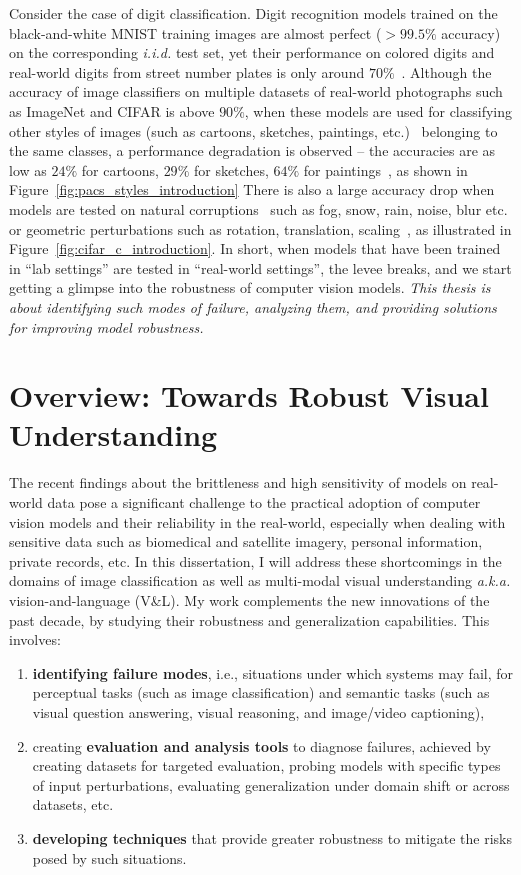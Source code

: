Consider the case of digit classification.
Digit recognition models trained on the black-and-white MNIST training images are almost perfect ($>99.5\%$ accuracy) on the corresponding \textit{i.i.d.} test set, yet their performance on colored digits and real-world digits from street number plates is only around $70\%$~\citep{xu2020robust}.
Although the accuracy of image classifiers on multiple datasets of real-world photographs such as ImageNet and CIFAR is above $90\%$, when these models are used for classifying other styles of images (such as cartoons, sketches, paintings, etc.)~\citep{venkateswara2017deep,li2017deeper} belonging to the same classes, a performance degradation is observed -- the accuracies are as low as $24\%$ for cartoons, $29\%$ for sketches, $64\%$ for paintings~\citep{nam2021reducing}, as shown in Figure~\ref{fig:pacs_styles_introduction}
There is also a large accuracy drop when models are tested on natural corruptions~\citep{hendrycks2018benchmarking} such as fog, snow, rain, noise, blur etc. or geometric perturbations such as rotation, translation, scaling~\citep{wong2020learning}, as illustrated in Figure~\ref{fig:cifar_c_introduction}.
In short, when models that have been trained in ``lab settings'' are tested in ``real-world settings'', the levee breaks, and we start getting a glimpse into the robustness of computer vision models. 
\textit{This thesis is about identifying such modes of failure, analyzing them, and providing solutions for improving model robustness.}

\section{Overview: Towards Robust Visual Understanding}
The recent findings about the brittleness and high sensitivity of models on real-world data pose a significant challenge to the practical adoption of computer vision models and their reliability in the real-world, especially when dealing with sensitive data such as biomedical and satellite imagery, personal information, private records, etc.
In this dissertation, I will address these shortcomings in the domains of image classification as well as multi-modal visual understanding \textit{a.k.a.} vision-and-language (V\&L).
My work complements the new innovations of the past decade, by studying their robustness and generalization capabilities.
This involves:
\begin{enumerate} 
    \item \textbf{identifying failure modes}, i.e., situations under which systems may fail, for perceptual tasks (such as image classification) and semantic tasks (such as visual question answering, visual reasoning, and image/video captioning),
    \item creating \textbf{evaluation and analysis tools} to diagnose failures, achieved by creating datasets for targeted evaluation, probing models with specific types of input perturbations, evaluating generalization under domain shift or across datasets, etc.
    \item \textbf{developing techniques} that provide greater robustness to mitigate the risks posed by such situations.
\end{enumerate}



